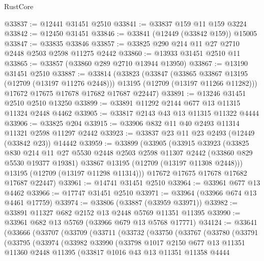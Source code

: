 \begin{lexlean}{RustCore}
\begin{coremodule}
@33837 := @12441 @31451 @2510
@33841 := @33837 @159 @11 @159 @3224
@33842 := @12450 @31451
@33846 := @33841 (@12449 (@33842 @159)) @15005
@33847 := @33835 @33846
@33857 := @33825 @290 @214 @11 @27 @2710 @2448 @2503 @2598 @11275 @2442
@33860 := @13933 @31451 @2510 @11
@33865 := @33857 (@33860 @289 @2710 @13944 @13950)
@33867 := @13190 @31451 @2510
@33887 := @33814
    (@33823
      (@33847
        (@33865 @33867 @13195 (@12709 (@13197 @11276 @2448)))
        @13195
        (@12709 (@13197 @11266 @11282)))
      @17672
      @17675
      @17678
      @17682
      @17687
      @22447)
@33891 := @13246 @31451 @2510 @2510 @13250
@33899 := @33891 @11292 @2144 @677 @13 @11315 @11324 @2448 @4462
@33905 := @33817 @2143 @43 @13 @11315 @11322 @4444
@33906 := @33825 @204
@33915 := @33906 @832 @11 @40 @2493 @11314 @11321 @2598 @11297 @2442
@33923 := @33837 @23 @11 @23 @2493 (@12449 (@33842 @23)) @14442
@33959 := @33899
    (@33905
      (@33915
        @33923
        (@33825
          @830
          @214
          @11
          @27
          @5530
          @2448
          @2503
          @2598
          @11307
          @2442
          (@33860 @829 @5530 @19377 @19381)
          @33867
          @13195
          (@12709 (@13197 @11308 @2448)))
        @13195
        (@12709 (@13197 @11298 @11314)))
      @17672
      @17675
      @17678
      @17682
      @17687
      @22447)
@33961 := @14741 @31451 @2510
@33964 := @33961 @677 @13 @4462
@33966 := @17747 @31451 @2510
@33971 := @33964 (@33966 @674 @13 @4461 @17759)
@33974 := @33806 (@33887 (@33959 @33971))
@33982 := @33891 @11327 @682 @2152 @13 @2448 @5769 @11351 @11395
@33990 := @33961 @682 @13 @5769 (@33966 @679 @13 @5768 @17771)
@34124 := @33641
    (@33666
      (@33707
        (@33709
          (@33711
            (@33732
              (@33750
                (@33767
                  (@33780
                    (@33791
                      (@33795
                        (@33974
                          (@33982
                            @33990
                            (@33798
                              @1017
                              @2150
                              @677
                              @13
                              @11351
                              @11360
                              @2448
                              @11395
                              (@33817
                                @1016
                                @43
                                @13
                                @11351
                                @11358
                                @4444

\end{coremodule}
\end{lexlean}
